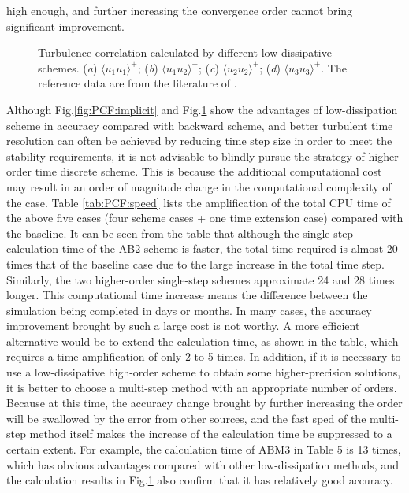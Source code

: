 \documentclass{article}
\begin{document}
high enough, and further increasing the convergence order cannot bring significant improvement.

\begin{figure}
	\centering
	\caption{Turbulence correlation calculated by different low-dissipative schemes. (\textit{a}) $\langle u_{1}u_{1} \rangle^+$; (\textit{b}) $\langle u_{1}u_{2} \rangle^+$; (\textit{c}) $\langle u_{2}u_{2} \rangle^+$; (\textit{d}) $\langle u_{3}u_{3} \rangle^+$. The reference data are from the literature of \citet{Kim:1987}.}
	\label{fig:PCF:explicit}
\end{figure}

Although Fig.\ref{fig:PCF:implicit} and Fig.\ref{fig:PCF:explicit} show the advantages of low-dissipation scheme in accuracy compared with backward scheme, and better turbulent time resolution can often be achieved by reducing time step size in order to meet the stability requirements, it is not advisable to blindly pursue the strategy of higher order time discrete scheme. This is because the additional computational cost may result in an order of magnitude change in the computational complexity of the case. Table \ref{tab:PCF:speed} lists the amplification of the total CPU time of the above five cases (four scheme cases + one time extension case) compared with the baseline. It can be seen from the table that although the single step calculation time of the AB2 scheme is faster, the total time required is almost 20 times that of the baseline case due to the large increase in the total time step. Similarly, the two higher-order single-step schemes approximate 24 and 28 times longer. This computational time increase means the difference between the simulation being completed in days or months. In many cases, the accuracy improvement brought by such a large cost is not worthy. A more efficient alternative would be to extend the calculation time, as shown in the table, which requires a time amplification of only 2 to 5 times. In addition, if it is necessary to use a low-dissipative high-order scheme to obtain some higher-precision solutions, it is better to choose a multi-step method with an appropriate number of orders. Because at this time, the accuracy change brought by further increasing the order will be swallowed by the error from other sources, and the fast sped of the multi-step method itself makes the increase of the calculation time be suppressed to a certain extent. For example, the calculation time of ABM3 in Table 5 is 13 times, which has obvious advantages compared with other low-dissipation methods, and the calculation results in Fig.\ref{fig:PCF:explicit} also confirm that it has relatively good accuracy.
\end{document}
